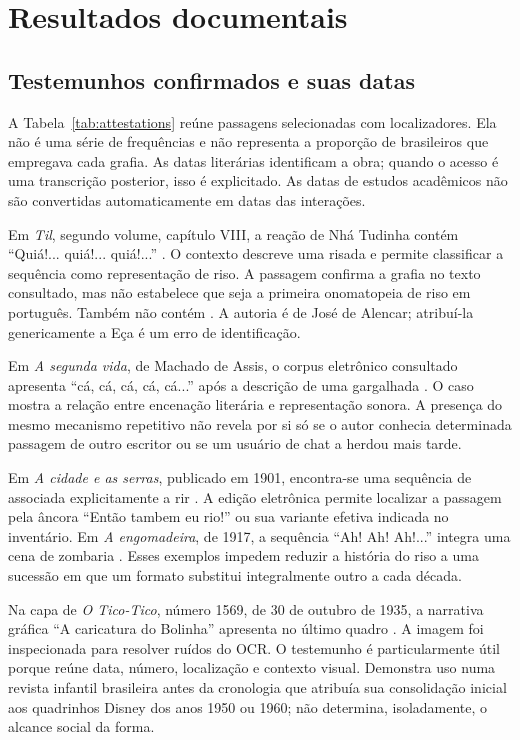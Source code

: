 \section{Resultados documentais}
\subsection{Testemunhos confirmados e suas datas}
A Tabela~\ref{tab:attestations} reúne passagens selecionadas com localizadores. Ela não é uma série de frequências e não representa a proporção de brasileiros que empregava cada grafia. As datas literárias identificam a obra; quando o acesso é uma transcrição posterior, isso é explicitado. As datas de estudos acadêmicos não são convertidas automaticamente em datas das interações.



Em \textit{Til}, segundo volume, capítulo VIII, a reação de Nhá Tudinha contém ``Quiá!... quiá!... quiá!...'' \cite{alencar1872}. O contexto descreve uma risada e permite classificar a sequência como representação de riso. A passagem confirma a grafia no texto consultado, mas não estabelece que seja a primeira onomatopeia de riso em português. Também não contém . A autoria é de José de Alencar; atribuí-la genericamente a Eça é um erro de identificação.

Em \textit{A segunda vida}, de Machado de Assis, o corpus eletrônico consultado apresenta ``cá, cá, cá, cá, cá...'' após a descrição de uma gargalhada \cite{assis1884}. O caso mostra a relação entre encenação literária e representação sonora. A presença do mesmo mecanismo repetitivo não revela por si só se o autor conhecia determinada passagem de outro escritor ou se um usuário de chat a herdou mais tarde.

Em \textit{A cidade e as serras}, publicado em 1901, encontra-se uma sequência de  associada explicitamente a rir \cite{queiros1901}. A edição eletrônica permite localizar a passagem pela âncora ``Então tambem eu rio!'' ou sua variante efetiva indicada no inventário. Em \textit{A engomadeira}, de 1917, a sequência ``Ah! Ah! Ah!...'' integra uma cena de zombaria \cite{almada1917}. Esses exemplos impedem reduzir a história do riso a uma sucessão em que um formato substitui integralmente outro a cada década.

Na capa de \textit{O Tico-Tico}, número 1569, de 30 de outubro de 1935, a narrativa gráfica ``A caricatura do Bolinha'' apresenta  no último quadro \cite{ticotico1935}. A imagem foi inspecionada para resolver ruídos do OCR. O testemunho é particularmente útil porque reúne data, número, localização e contexto visual. Demonstra uso numa revista infantil brasileira antes da cronologia que atribuía sua consolidação inicial aos quadrinhos Disney dos anos 1950 ou 1960; não determina, isoladamente, o alcance social da forma.


